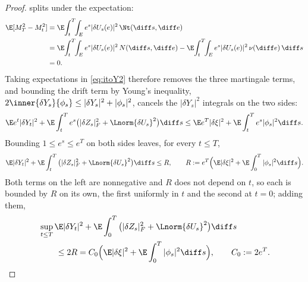 \begin{proof}
splits under the expectation:
\begin{align*}
\E[M^2_T-M^2_t]
&=\E\!\int_t^T\!\!\int_E e^{s}|\delta U_s(e)|^2\,\Nt(\diff s,\diff e)\\
&=\E\!\int_t^T\!\!\int_E e^{s}|\delta U_s(e)|^2\,N(\diff s,\diff e)
-\E\!\int_t^T\!\!\int_E e^{s}|\delta U_s(e)|^2\,\nu(\diff e)\,\diff s\\
&=0 .
\end{align*}
Taking
expectations in \eqref{eq:itoY2} therefore removes the three martingale terms, and
bounding the drift term by Young's inequality,
$2\inner{\delta Y_s}{\phi_s}\le|\delta Y_s|^2+|\phi_s|^2$, cancels the $|\delta Y_s|^2$
integrals on the two sides:
\[
\E e^{t}|\delta Y_t|^2
+\E\int_t^T e^{s}\big(|\delta Z_s|_F^2+\Lnorm{\delta U_s}^2\big)\diff s
\le
\E e^{T}|\delta\xi|^2
+\E\int_t^T e^{s}|\phi_s|^2\diff s .
\]
Bounding $1\le e^{s}\le e^{T}$ on both sides leaves, for every $t\le T$,
\[
\E|\delta Y_t|^2+\E\int_t^T\big(|\delta Z_s|_F^2+\Lnorm{\delta U_s}^2\big)\diff s\le R ,
\qquad
R:=e^{T}\Big(\E|\delta\xi|^2+\E\int_0^T|\phi_s|^2\diff s\Big).
\]
Both terms on the left are nonnegative and $R$ does not depend on $t$, so each is bounded
by $R$ on its own, the first uniformly in $t$ and the second at $t=0$; adding them,
\begin{equation}\label{eq:supE}
\begin{aligned}
&\sup_{t\le T}\E|\delta Y_t|^2
+\E\int_0^T\big(|\delta Z_s|_F^2+\Lnorm{\delta U_s}^2\big)\diff s\\
&\qquad\le 2R
=C_0\Big(\E|\delta\xi|^2+\E\int_0^T|\phi_s|^2\diff s\Big),
\qquad
C_0:=2e^{T} .
\end{aligned}
\end{equation}


\end{proof}
